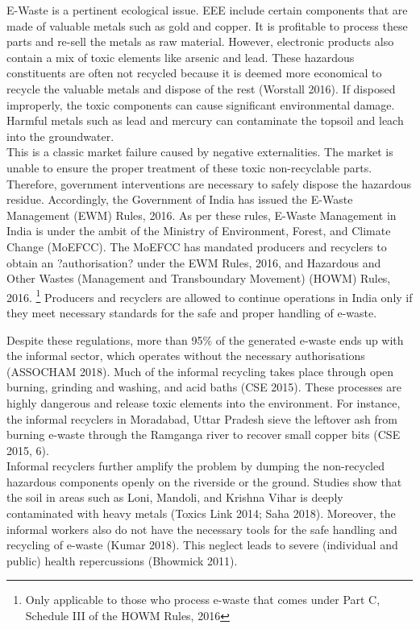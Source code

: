 \documentclass[a4paper, 12pt]{article}
\begin{document}
                    E-Waste is a pertinent ecological issue. EEE include certain components that are made of valuable metals such as gold and copper. It is profitable to process these parts and re-sell the metals as raw material. However, electronic products also contain a mix of toxic elements like arsenic and lead. These hazardous constituents are often not recycled because it is deemed more economical to recycle the valuable metals and dispose of the rest (Worstall 2016). If disposed improperly, the toxic components can cause significant environmental damage. Harmful metals such as lead and mercury can contaminate the topsoil and leach into the groundwater. \\
                    
                    This is a classic market failure caused by negative externalities. The market is unable to ensure the proper treatment of these toxic non-recyclable parts. Therefore,  government interventions are necessary to safely dispose the hazardous residue. Accordingly, the Government of India has issued the E-Waste Management (EWM) Rules, 2016. As per these rules, E-Waste Management in India is under the ambit of the Ministry of Environment, Forest, and Climate Change (MoEFCC). The MoEFCC has mandated producers and recyclers to obtain an ?authorisation? under the EWM Rules, 2016, and Hazardous and Other Wastes (Management and Transboundary Movement) (HOWM) Rules, 2016. \footnote{Only applicable to those who process e-waste that comes under Part C, Schedule III of the HOWM Rules, 2016} Producers and recyclers are allowed to continue operations in India only if they meet necessary standards for the  safe and proper handling of e-waste.
                     
                    Despite these regulations, more than 95\% of the generated e-waste ends up with the informal sector, which operates without the necessary authorisations (ASSOCHAM 2018). Much of the informal recycling takes place through open burning, grinding and washing, and acid baths (CSE 2015). These processes are highly dangerous and release toxic elements into the environment. For instance, the informal recyclers in Moradabad, Uttar Pradesh sieve the leftover ash from burning e-waste through the Ramganga river to recover small copper bits (CSE 2015, 6). \\
                    
                    Informal recyclers further amplify the problem by dumping the non-recycled hazardous components openly on the riverside or the ground. Studies show that the soil in areas such as Loni, Mandoli, and Krishna Vihar is deeply contaminated with heavy metals (Toxics Link 2014; Saha 2018). Moreover, the informal workers also do not have the necessary tools for the safe handling and recycling of e-waste (Kumar 2018). This neglect leads to severe (individual and public) health repercussions (Bhowmick 2011). \\
                    
\end{document}
